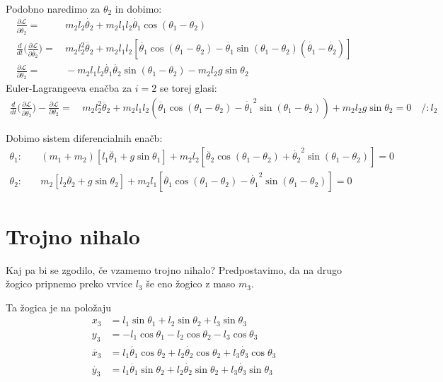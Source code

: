 \documentclass[a4paper,11pt]{article}
\begin{document}
Podobno naredimo za $\theta_2$ in dobimo:
\begin{align*}
    \frac{\partial \mathcal{L}}{\partial \dot{\theta_2}} =& \, m_2 l_2 \dot{\theta_2} + m_2 l_1 l_2 \dot{\theta_1} \cos(\theta_1 - \theta_2)\\
    \frac{d}{dt} \Big(\frac{\partial \mathcal{L}}{\partial \dot{\theta_2}}\Big) =& \, m_2 l_2^2 \ddot{\theta_2} + m_2 l_1 l_2 [\ddot{\theta_1} \cos(\theta_1 - \theta_2) - \dot{\theta_1} \sin (\theta_1 - \theta_2)(\dot{\theta_1} - \dot{\theta_2})]\\
    \frac{\partial \mathcal{L}}{\partial \theta_2}=& \, -m_2 l_1 l_2 \dot{\theta_1} \dot{\theta_2} \sin(\theta_1 - \theta_2) - m_2 l_2 g \sin \theta_2
\end{align*}
Euler-Lagrangeeva enačba za $i=2$ se torej glasi:
\begin{align*}
    \frac{d}{dt} \Big(\frac{\partial \mathcal{L}}{\partial \dot{\theta_2}}\Big) - \frac{\partial \mathcal{L}}{\partial \theta_2} =& \, m_2 l_2^2 \ddot{\theta_2} + m_2 l_1 l_2 (\ddot{\theta_1} \cos(\theta_1 - \theta_2) - \dot{\theta_1}^2 \sin (\theta_1 - \theta_2)) + m_2l_2 g \sin \theta_2 =0 \quad /:l_2
\end{align*}

Dobimo sistem diferencialnih enačb:
\begin{align*}
    \theta_1: &\quad (m_1 + m_2)[l_1 \ddot{\theta_1} + g \sin \theta_1] + m_2 l_2 [\ddot{\theta_2} \cos(\theta_1 - \theta_2) + \dot{\theta_2}^2 \sin(\theta_1-\theta_2)] = 0\\
    \theta_2: &\quad m_2 [l_2 \ddot{\theta_2} + g \sin \theta_2] + m_2 l_1 [\ddot{\theta_1} \cos(\theta_1 - \theta_2) - \dot{\theta_1}^2 \sin(\theta_1 - \theta_2)] =0
\end{align*}

\section{Trojno nihalo}
Kaj pa bi se zgodilo, če vzamemo trojno nihalo? Predpostavimo, da na drugo žogico pripnemo preko vrvice $l_3$ še eno žogico z maso $m_3$.

Ta žogica je na položaju 
\begin{align*}
    x_3 &= l_1 \sin\theta_1 + l_2 \sin \theta_2 + l_3 \sin \theta_3\\
    y_3 &= - l_1 \cos \theta_1 - l_2 \cos \theta_2 - l_3 \cos \theta_3\\
    \dot{x_3} &= l_1 \dot{\theta_1} \cos \theta_2 + l_2 \dot{\theta_2} \cos \theta_2 + l_3 \dot{\theta_3} \cos \theta_3\\
    \dot{y_3} &= l_1 \dot{\theta_1} \sin \theta_2 + l_2 \dot{\theta_2} \sin \theta_2 + l_3 \dot{\theta_3} \sin \theta_3
\end{align*}
\end{document}
